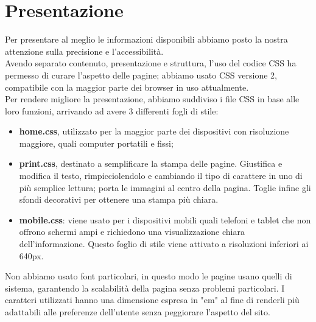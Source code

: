 \section{Presentazione}{
	Per presentare al meglio le informazioni disponibili abbiamo posto la nostra attenzione sulla precisione e l'accessibilità.\\
	Avendo separato contenuto, presentazione e struttura, l'uso del codice CSS ha permesso di curare l'aspetto delle pagine; abbiamo usato CSS versione 2, compatibile con la maggior parte dei browser in uso attualmente.\\
	Per rendere migliore la presentazione, abbiamo suddiviso i file CSS in base alle loro funzioni, arrivando ad avere 3 differenti fogli di stile:
	\begin{itemize}
		\item \textbf{home.css}, utilizzato per la maggior parte dei dispositivi con risoluzione maggiore, quali computer portatili e fissi;
		\item \textbf{print.css}, destinato a semplificare la stampa delle pagine.
		Giustifica e modifica il testo, rimpicciolendolo e cambiando il tipo di carattere in uno di più semplice lettura; porta le immagini al centro della pagina. Toglie infine gli sfondi decorativi per ottenere una stampa più chiara.
		
\item \textbf{mobile.css}: viene usato per i dispositivi mobili quali telefoni e tablet che non offrono schermi ampi e richiedono 
		una visualizzazione chiara dell'informazione. Questo foglio di stile viene attivato a risoluzioni inferiori ai 640px.
	\end{itemize}
	Non abbiamo usato font particolari, in questo modo le pagine usano quelli di sistema, garantendo la scalabilità della pagina senza problemi particolari. I caratteri utilizzati hanno una dimensione espresa in "em" al fine di renderli più adattabili alle preferenze dell'utente senza peggiorare l'aspetto del sito.
}